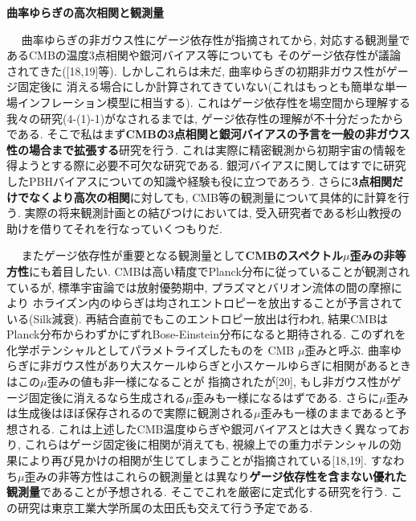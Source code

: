 \documentclass[11pt,a4paper,twoside]{jarticle}
\renewcommand{\emph}[1]{{\sffamily\gtfamily\bfseries #1}}
\newcommand{\subject}[1]{\noindent{\sffamily\gtfamily\bfseries #1}~~}
\newcommand{\研究課題名}{\mgfamily\sffamily インフレーション宇宙における曲率ゆらぎと原始ブラックホール形成}
\newcommand{\研究機関名}{\mgfamily\sffamily Institut d'Astrophysique de Paris}
\newcommand{\申請者氏名}{\mgfamily\sffamily 多田祐一郎}
\newcommand{\研究代表者氏名}{\申請者氏名}
\newcommand{\研究期間の最終元号年度}{32}	%
\begin{document}
{	
	
	
	\begin{mdframed}[roundcorner=0.5zw,
	innertopmargin=0.8zw,innerbottommargin=0.8zw,
	linecolor=black!50,linewidth=0.2zw,
	backgroundcolor=black!10]
	{\bfseries\gtfamily\sffamily\large 曲率ゆらぎの高次相関と観測量}
	\end{mdframed}
	
	\subject{5. CMB温度ゆらぎと銀河バイアス}
	曲率ゆらぎの非ガウス性にゲージ依存性が指摘されてから, 対応する観測量であるCMBの温度3点相関や銀河バイアス等についても
	そのゲージ依存性が議論されてきた([18,19]等). しかしこれらは未だ, 曲率ゆらぎの初期非ガウス性がゲージ固定後に
	消える場合にしか計算されてきていない(これはもっとも簡単な単一場インフレーション模型に相当する).
	これはゲージ依存性を場空間から理解する我々の研究(4-(1)-1)がなされるまでは, ゲージ依存性の理解が不十分だったからである.
	そこで私はまず\emph{CMBの3点相関と銀河バイアスの予言を一般の非ガウス性の場合まで拡張する}研究を行う.
	これは実際に精密観測から初期宇宙の情報を得ようとする際に必要不可欠な研究である.
	銀河バイアスに関してはすでに研究したPBHバイアスについての知識や経験も役に立つであろう.
	さらに\emph{3点相関だけでなくより高次の相関}に対しても, CMB等の観測量について具体的に計算を行う.
	実際の将来観測計画との結びつけにおいては, 受入研究者である杉山教授の助けを借りてそれを行なっていくつもりだ.
	\vspace{3pt}
	
	\subject{6. CMB \boldmath$\mu$歪み}
	またゲージ依存性が重要となる観測量として\emph{CMBのスペクトル\boldmath$\mu$歪みの非等方性}にも着目したい.
	CMBは高い精度でPlanck分布に従っていることが観測されているが, 標準宇宙論では放射優勢期中, プラズマとバリオン流体の間の摩擦により
	ホライズン内のゆらぎは均されエントロピーを放出することが予言されている(Silk減衰). 再結合直前でもこのエントロピー放出は行われ,
	結果CMBはPlanck分布からわずかにずれBose-Einstein分布になると期待される. このずれを化学ポテンシャルとしてパラメトライズしたものを
	CMB $\mu$歪みと呼ぶ.
	曲率ゆらぎに非ガウス性があり大スケールゆらぎと小スケールゆらぎに相関があるときはこの$\mu$歪みの値も非一様になることが
	指摘されたが[20], もし非ガウス性がゲージ固定後に消えるなら生成される$\mu$歪みも一様になるはずである.
	さらに$\mu$歪みは生成後はほぼ保存されるので実際に観測される$\mu$歪みも一様のままであると予想される.
	これは上述したCMB温度ゆらぎや銀河バイアスとは大きく異なっており, これらはゲージ固定後に相関が消えても,
	視線上での重力ポテンシャルの効果により再び見かけの相関が生じてしまうことが指摘されている[18,19].
	すなわち$\mu$歪みの非等方性はこれらの観測量とは異なり\emph{ゲージ依存性を含まない優れた観測量}であることが予想される.
	そこでこれを厳密に定式化する研究を行う.
	この研究は東京工業大学所属の太田氏も交えて行う予定である.
	
}
\end{document}

